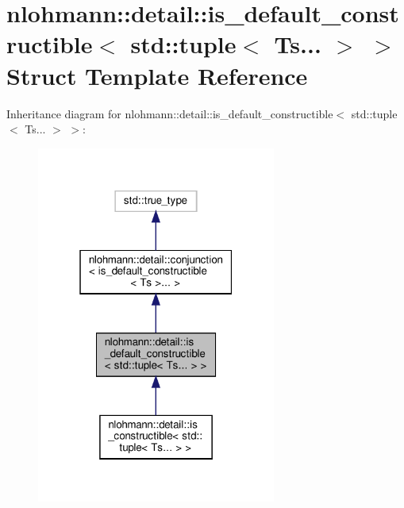 \hypertarget{structnlohmann_1_1detail_1_1is__default__constructible_3_01std_1_1tuple_3_01Ts_8_8_8_01_4_01_4}{}\section{nlohmann\+:\+:detail\+:\+:is\+\_\+default\+\_\+constructible$<$ std\+:\+:tuple$<$ Ts... $>$ $>$ Struct Template Reference}
\label{structnlohmann_1_1detail_1_1is__default__constructible_3_01std_1_1tuple_3_01Ts_8_8_8_01_4_01_4}


Inheritance diagram for nlohmann\+:\+:detail\+:\+:is\+\_\+default\+\_\+constructible$<$ std\+:\+:tuple$<$ Ts... $>$ $>$\+:
\nopagebreak
\begin{figure}[H]
\begin{center}
\leavevmode
\includegraphics[width=223pt]{structnlohmann_1_1detail_1_1is__default__constructible_3_01std_1_1tuple_3_01Ts_8_8_8_01_4_01_4__inherit__graph}
\end{center}
\end{figure}


